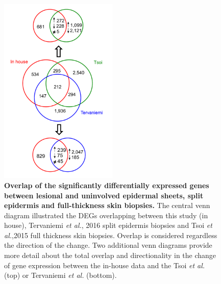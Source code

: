 

\begin{figure}[htbp]
\centering
\includegraphics[width=0.5\textwidth]{./Results2/pdfs/skin_transcriptomics_venn_diagrams}
\caption[Overlap of the significantly differentially expressed genes between lesional and uninvolved epidermal sheets, split epidermis and whole skin biopsies.]{\textbf{Overlap of the significantly differentially expressed genes between lesional and uninvolved epidermal sheets, split epidermis and full-thickness skin biopsies.} The central venn diagram illustrated the DEGs overlapping between this study (in house), Tervaniemi \textit{et al.}, 2016 split epidermis biopsies and Tsoi \textit{et al.},2015 full thickness skin biopsies. Overlap is considered regardless the direction of the change. Two additional venn diagrams provide more detail about the total overlap and directionality in the change of gene expression between the in-house data and the Tsoi \textit{et al.} (top) or Tervaniemi \textit{et al.} (bottom).}
\label{figure:Skin_venn_diagrams_comparison_other_studies}
\end{figure}



